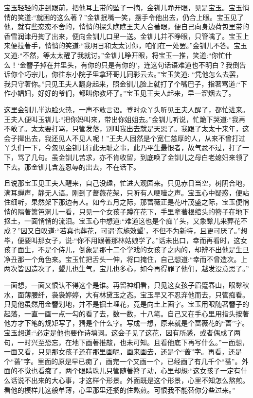\begin{parag}
    宝玉轻轻的走到跟前，把他耳上带的坠子一摘，金钏儿睁开眼，见是宝玉。宝玉悄悄的笑道:“就困的这么著？”金钏抿嘴一笑，摆手令他出去，仍合上眼。宝玉见了他，就有些恋恋不舍的，悄悄的探头瞧瞧王夫人合著眼，便自己向身边荷包里带的香雪润津丹掏了出来，便向金钏儿口里一送。金钏儿并不睁眼，只管噙了。宝玉上来便拉著手，悄悄的笑道:“我明日和太太讨你，咱们在一处罢。”金钏儿不答。宝玉又道:“不然，等太太醒了我就讨。”金钏儿睁开眼，将宝玉一推，笑道:“你忙什么！‘金簪子掉在井里头，有你的只是有你的’，连这句话语难道也不明白？我倒告诉你个巧宗儿，你往东小院子里拿环哥儿同彩云去。”宝玉笑道: “凭他怎么去罢，我只守著你。”只见王夫人翻身起来，照金钏儿脸上就打了个嘴巴子，指著骂道:“下作小娼妇，好好的爷们，都叫你教坏了。”宝玉见王夫人起来，早一溜烟去了。
\end{parag}


\begin{parag}
    这里金钏儿半边脸火热，一声不敢言语。登时众丫头听见王夫人醒了，都忙进来。王夫人便叫玉钏儿:“把你妈叫来，带出你姐姐去。”金钏儿听说，忙跪下哭道:“我再不敢了。太太要打骂，只管发落，别叫我出去就是天恩了。我跟了太太十来年，这会子撵出去，我还见人不见人呢！”王夫人固然是个宽仁慈厚的人，从来不曾打过丫头们一下，今忽见金钏儿行此无耻之事，此乃平生最恨者，故气忿不过，打了一下，骂了几句。虽金钏儿苦求，亦不肯收留，到底唤了金钏儿之母白老媳妇来领了下去。那金钏儿含羞忍辱的出去，不在话下。
\end{parag}


\begin{parag}
    且说那宝玉见王夫人醒来，自己没趣，忙进大观园来。只见赤日当空，树阴合地，满耳蝉声，静无人语。刚到了蔷薇花架，只听有人哽噎之声。宝玉心中疑惑，便站住细听，果然架下那边有人。如今五月之际，那蔷薇正是花叶茂盛之际，宝玉便悄悄的隔著篱笆洞儿一看，只见一个女孩子蹲在花下，手里拿著根绾头的簪子在地下抠土，一面悄悄的流泪。宝玉心中想道:“难道这也是个痴丫头，又象颦儿来葬花不成？”因又自叹道:“若真也葬花，可谓‘东施效颦’，不但不为新特，且更可厌了。”想毕，便要叫那女子，说:“你不用跟著那林姑娘学了。”话未出口，幸而再看时，这女孩子面生，不是个侍儿，倒象是那十二个学戏的女孩子之内的，却辨不出他是生旦净丑那一个角色来。宝玉忙把舌头一伸，将口掩住，自己想道:“幸而不曾造次。上两次皆因造次了，颦儿也生气，宝儿也多心，如今再得罪了他们，越发没意思了。”
\end{parag}


\begin{parag}
    一面想，一面又恨认不得这个是谁。再留神细看，只见这女孩子眉蹙春山，眼颦秋水，面薄腰纤，袅袅婷婷，大有林黛玉之态。宝玉早又不忍弃他而去，只管痴看。只见他虽然用金簪划地，并不是掘土埋花，竟是向土上画字。宝玉用眼随著簪子的起落，一直一画一点一勾的看了去，数一数，十八笔。自己又在手心里用指头按著他方才下笔的规矩写了，猜是个什么字。写成一想，原来就是个蔷薇花的“蔷”字。宝玉想道:“必定是他也要作诗填词。这会子见了这花，因有所感，或者偶成了两句，一时兴至恐忘，在地下画著推敲，也未可知。且看他底下再写什么。”一面想，一面又看，只见那女孩子还在那里画呢，画来画去，还是个“蔷”字。再看，还是个“蔷”字。里面的原是早已痴了，画完一个又画一个，已经画了有几千个“蔷”。外面的不觉也看痴了，两个眼睛珠儿只管随著簪子动，心里却想:“这女孩子一定有什么话说不出来的大心事，才这样个形景。外面既是这个形景，心里不知怎么熬煎。看他的模样儿这般单薄，心里那里还搁的住熬煎。可恨我不能替你分些过来。”
\end{parag}


